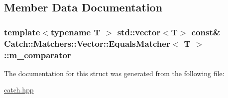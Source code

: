 \subsection{Member Data Documentation}
\hypertarget{struct_catch_1_1_matchers_1_1_vector_1_1_equals_matcher_a56f7aa6f110a12b1b9aeb0cabbc9d755}{
\subsubsection[{m\-\_\-comparator}]{\setlength{\rightskip}{0pt plus 5cm}template$<$typename T $>$ std\-::vector$<$T$>$ const\& {\bf Catch\-::\-Matchers\-::\-Vector\-::\-Equals\-Matcher}$<$ T $>$\-::m\-\_\-comparator}}\label{struct_catch_1_1_matchers_1_1_vector_1_1_equals_matcher_a56f7aa6f110a12b1b9aeb0cabbc9d755}


The documentation for this struct was generated from the following file\-:\begin{DoxyCompactItemize}
\item 
\hyperlink{catch_8hpp}{catch.\-hpp}\end{DoxyCompactItemize}
